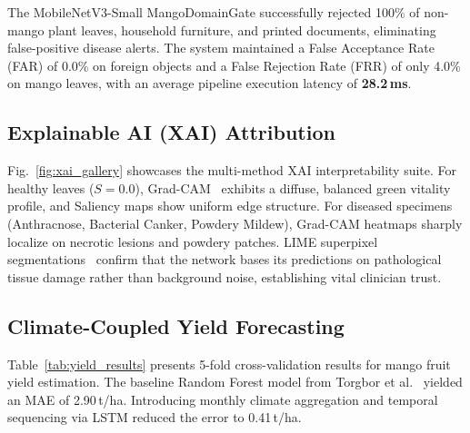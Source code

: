 \documentclass[conference]{IEEEtran}
\begin{document}
The MobileNetV3-Small MangoDomainGate successfully rejected 100\% of non-mango plant leaves, household furniture, and printed documents, eliminating false-positive disease alerts. The system maintained a False Acceptance Rate (FAR) of 0.0\% on foreign objects and a False Rejection Rate (FRR) of only 4.0\% on mango leaves, with an average pipeline execution latency of \textbf{28.2\,ms}.

\subsection{Explainable AI (XAI) Attribution}
Fig.~\ref{fig:xai_gallery} showcases the multi-method XAI interpretability suite. For healthy leaves ($S=0.0$), Grad-CAM~\cite{selvaraju2017gradcam} exhibits a diffuse, balanced green vitality profile, and Saliency maps show uniform edge structure. For diseased specimens (Anthracnose, Bacterial Canker, Powdery Mildew), Grad-CAM heatmaps sharply localize on necrotic lesions and powdery patches. LIME superpixel segmentations~\cite{ribeiro2016why} confirm that the network bases its predictions on pathological tissue damage rather than background noise, establishing vital clinician trust.

\subsection{Climate-Coupled Yield Forecasting}
Table~\ref{tab:yield_results} presents 5-fold cross-validation results for mango fruit yield estimation. The baseline Random Forest model from Torgbor et al.~\cite{torgbor2023remote} yielded an MAE of 2.90\,t/ha. Introducing monthly climate aggregation and temporal sequencing via LSTM reduced the error to 0.41\,t/ha.

\begin{table}[!htbp]
\caption{5-Fold Cross-Validation Metrics for Yield Regressors}
\label{tab:yield_results}
\centering
{}
\end{table}
\end{document}

